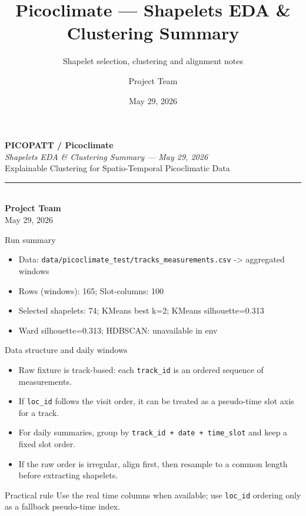\documentclass[aspectratio=169]{beamer}
\title{Picoclimate — Shapelets EDA \& Clustering Summary}
\subtitle{Shapelet selection, clustering and alignment notes}
\author{Project Team}
\date{May 29, 2026}
\begin{document}
{
\begin{frame}[plain]
\vspace{1.1cm}
{\color{white}\huge\bfseries PICOPATT / Picoclimate}\\[5pt]
{\color{cteal}\large\itshape Shapelets EDA \& Clustering Summary --- May 29, 2026}\\[8pt]
{\color{caccent}\small Explainable Clustering for Spatio-Temporal Picoclimatic Data}\\[0.6cm]
{\color{cmid}\rule{5.2cm}{0.8pt}}\\[5pt]
{\color{caccent}\footnotesize\textbf{Project Team}}\\[2pt]
{\color{caccent}\footnotesize May 29, 2026}
\end{frame}}

\begin{frame}{Run summary}
\begin{itemize}
  \item Data: \texttt{data/picoclimate\_test/tracks\_measurements.csv} -> aggregated windows
  \item Rows (windows): 165; Slot-columns: 100
  \item Selected shapelets: 74; KMeans best k=2; KMeans silhouette=0.313
  \item Ward silhouette=0.313; HDBSCAN: unavailable in env
\end{itemize}
\end{frame}

\begin{frame}{Data structure and daily windows}
\begin{itemize}
  \item Raw fixture is track-based: each \texttt{track\_id} is an ordered sequence of measurements.
  \item If \texttt{loc\_id} follows the visit order, it can be treated as a pseudo-time slot axis for a track.
  \item For daily summaries, group by \texttt{track\_id + date + time\_slot} and keep a fixed slot order.
  \item If the raw order is irregular, align first, then resample to a common length before extracting shapelets.
\end{itemize}
\begin{block}{Practical rule}
Use the real time columns when available; use \texttt{loc\_id} ordering only as a fallback pseudo-time index.
\end{block}
\end{frame}
\end{document}
